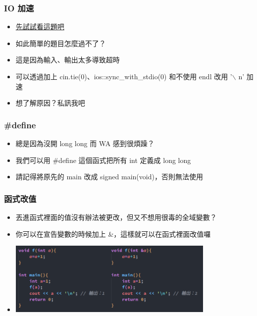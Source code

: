\documentclass{beamer}
\begin{document}
\begin{frame}
    \frametitle{IO 加速}
    \begin{itemize}
        \item \href{https://codeforces.com/group/S6XjkGb6qB/contest/403070/problem/A}{先試試看這題吧}
        \item<2-> 如此簡單的題目怎麼過不了？
        \item<3-> 這是因為輸入、輸出太多導致超時
        \item<3-> 可以透過加上 cin.tie(0)、ios::sync\_with\_stdio(0) 和不使用 endl 改用 '$\backslash$ n' 加速
        \item<4-> 想了解原因？私訊我吧
    \end{itemize}
\end{frame}

\begin{frame}
    \frametitle{\#define}
    \begin{itemize}
        \item 總是因為沒開 long long 而 WA 感到很煩躁？
        \item<2-> 我們可以用 \#define 這個函式把所有 int 定義成 long long
        \item<3-> 請記得將原先的 main 改成 signed main(void)，否則無法使用
    \end{itemize}
\end{frame}

\begin{frame}
    \frametitle{函式改值}
    \begin{itemize}
        \item 丟進函式裡面的值沒有辦法被更改，但又不想用很毒的全域變數？
        \item 你可以在宣告變數的時候加上 \&，這樣就可以在函式裡面改值囉
        \vspace{0.5cm}
        \item \includegraphics[width=10.0cm]{img/code_3.png}
    \end{itemize}
\end{frame}
\end{document}
